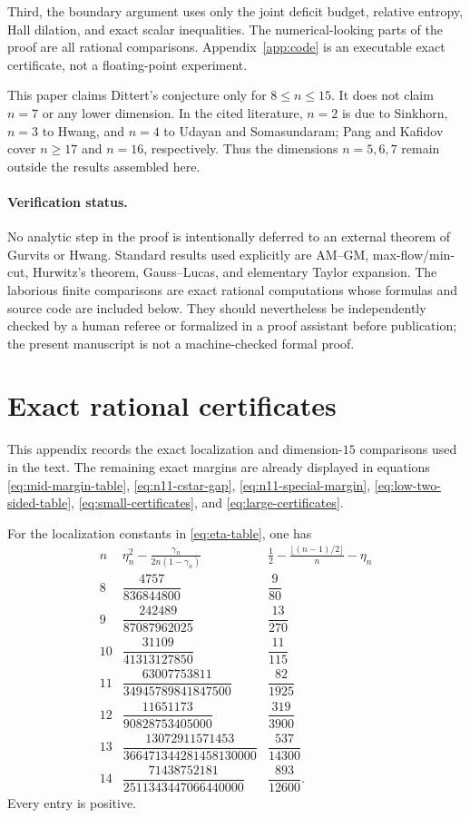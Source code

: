 \documentclass[11pt]{article}
\theoremstyle{definition}
\newcommand{\1}{\mathbf{1}}
\begin{document}
Third, the boundary argument uses only the joint deficit budget, relative entropy, Hall dilation, and exact scalar inequalities.  The numerical-looking parts of the proof are all rational comparisons.  Appendix~\ref{app:code} is an executable exact certificate, not a floating-point experiment.

This paper claims Dittert's conjecture only for $8\le n\le15$.  It does not claim $n=7$ or any lower dimension.  In the cited literature, $n=2$ is due to Sinkhorn, $n=3$ to Hwang, and $n=4$ to Udayan and Somasundaram; Pang and Kafidov cover $n\ge17$ and $n=16$, respectively.  Thus the dimensions $n=5,6,7$ remain outside the results assembled here.

\paragraph{Verification status.}
No analytic step in the proof is intentionally deferred to an external theorem of Gurvits or Hwang.  Standard results used explicitly are AM--GM, max-flow/min-cut, Hurwitz's theorem, Gauss--Lucas, and elementary Taylor expansion.  The laborious finite comparisons are exact rational computations whose formulas and source code are included below.  They should nevertheless be independently checked by a human referee or formalized in a proof assistant before publication; the present manuscript is not a machine-checked formal proof.

\appendix

\section{Exact rational certificates}\label{app:certificates}

This appendix records the exact localization and dimension-$15$ comparisons used in the text.  The remaining exact margins are already displayed in equations \eqref{eq:mid-margin-table}, \eqref{eq:n11-cstar-gap}, \eqref{eq:n11-special-margin}, \eqref{eq:low-two-sided-table}, \eqref{eq:small-certificates}, and \eqref{eq:large-certificates}.

For the localization constants in \eqref{eq:eta-table}, one has
\[
\begin{array}{c|c|c}
 n&\displaystyle
 \eta_n^2-\frac{\gamma_n}{2n(1-\gamma_n)}
 &\displaystyle
 \frac12-\frac{\lfloor(n-1)/2\rfloor}{n}-\eta_n\\ \hline
 8&\dfrac{4757}{836844800}&\dfrac9{80}\\[3mm]
 9&\dfrac{242489}{87087962025}&\dfrac{13}{270}\\[3mm]
 10&\dfrac{31109}{41313127850}&\dfrac{11}{115}\\[3mm]
 11&\dfrac{63007753811}{34945789841847500}&\dfrac{82}{1925}\\[3mm]
 12&\dfrac{11651173}{90828753405000}&\dfrac{319}{3900}\\[3mm]
 13&\dfrac{13072911571453}{366471344281458130000}&\dfrac{537}{14300}\\[3mm]
 14&\dfrac{71438752181}{2511343447066440000}&\dfrac{893}{12600}.
\end{array}
\tag{A.1}\label{eq:localization-certificates}
\]
Every entry is positive.
\end{document}
